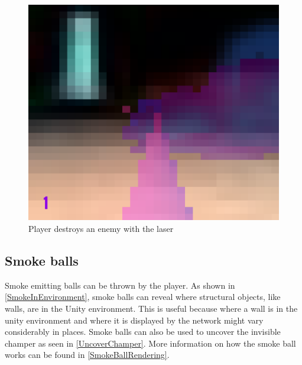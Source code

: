 \begin{figure}[p]
  \includegraphics[height=0.3\textheight, width=0.42\textheight]{images/game_systems/Shoot3.png}
  \caption{Player destroys an enemy with the laser}
  \label{DestroyEnemy}
\end{figure}


\subsection{Smoke balls}
Smoke emitting  balls can be thrown by the player. As shown in \cref{SmokeInEnvironment}, smoke balls can reveal where structural objects, like walls, are in the Unity environment. This is useful because where a wall is in the unity environment and where it is displayed by the network might vary considerably in places. Smoke balls can also be used to uncover the invisible champer as seen in \cref{UncoverChamper}. More information on how the smoke ball works can be found in \cref{SmokeBallRendering}.

